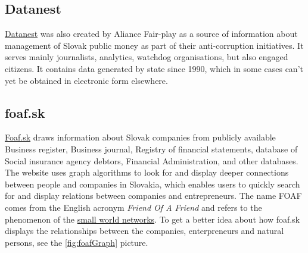 \documentclass[thesis=B,english]{sprlajur-slovakopendata}[2018/05/12]
\begin{document}
\subsection{Datanest}
\href{http://datanest.fair-play.sk/}{Datanest} was also created by Aliance Fair-play as a source of information about management of Slovak public money as part of their anti-corruption initiatives. It serves mainly journalists, analytics, watchdog organisations, but also engaged citizens. It contains data generated by state since 1990, which in some cases can't yet be obtained in electronic form elsewhere.
\subsection{foaf.sk}
\href{http://foaf.sk}{Foaf.sk} draws information about Slovak companies from publicly available Business register, Business journal, Registry of financial statements, database of Social insurance agency debtors, Financial Administration, and other databases. The website uses graph algorithms to look for and display deeper connections between people and companies in Slovakia, which enables users to quickly search for and display relations between companies and entrepreneurs. The name FOAF comes from the English acronym \textit{Friend Of A Friend} and refers to the phenomenon of the \href{http://www.scholarpedia.org/article/Small-world_network}{small world networks}. To get a better idea about how foaf.sk displays the relationships between the companies, enterpreneurs and natural persons, see the \ref{fig:foafGraph} picture.

	
\end{document}
